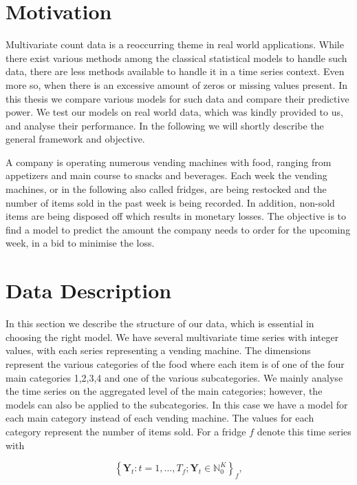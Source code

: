 \section{Motivation}
\label{sec:Motivation}

Multivariate count data is a reoccurring theme in real world applications. While there exist various methods among the classical statistical models to handle such data, there are less methods available to handle it in a time series context. Even more so, when there is an excessive amount of zeros or missing values present. In this thesis we compare various models for such data and compare their predictive power. We test our models on real world data, which was kindly provided to us, and analyse their performance. In the following we will shortly describe the general framework and objective. 

A company is operating numerous vending machines with food, ranging from appetizers and main course to snacks and beverages. Each week the vending machines, or in the following also called fridges, are being restocked and the number of items sold in the past week is being recorded. In addition, non-sold items are being disposed off which results in monetary losses. The objective is to find a model to predict the amount the company needs to order for the upcoming week, in a bid to minimise the loss.

\section{Data Description}
\label{sec: Data Description}

In this section we describe the structure of our data, which is essential in choosing the right model. We have several multivariate time series with integer values, with each series representing a vending machine. The dimensions represent the various categories of the food where each item is of one of the four main categories 1,2,3,4 and one of the various subcategories. We mainly analyse the time series on the aggregated level of the main categories; however, the models can also be applied to the subcategories. In this case we have a model for each main category instead of each vending machine. The values for each category represent the number of items sold. For a fridge $f$ denote this time series with 

\begin{equation}
\left\{\bm{Y}_t:t=1,\ldots,T_f; \bm{Y}_t \in \mathbb{N}_0^K \right\}_f,
\label{eq:time series definition}
\end{equation}

